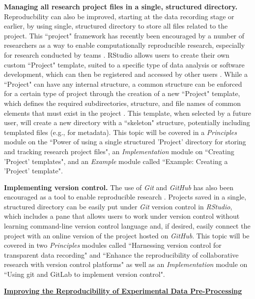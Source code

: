 \documentclass[pdftex,english,11pt,parskip=half]{scrartcl}
\begin{document}
\textbf{Managing all research project files in a single, structured directory.} Reproducbility can also be improved, starting at the data recording stage or earlier, by using single, structured directory to store all files related to the project. This ``project" framework has recently been encouraged by a number of researchers as a way to enable computationally reproducible research, especially for research conducted by teams \cite{marwick2017packaging, parker2017opinionated, lowndes2017our}. RStudio allows users to create their own custom ``Project" template, suited to a specific type of data analysis or software development, which can then be registered and accessed by other users \cite{rstudioprojecttemplate}. While a ``Project" can have any internal structure, a common structure can be enforced for a certain type of project through the creation of a new ``Project" template, which defines the required subdirectories, structure, and file names of common elements that must exist in the project \cite{rstudioprojecttemplate}. This template, when selected by a future user, will create a new directory with a ``skeleton" structure, potentially including templated files (e.g., for metadata). This topic will be covered in a \textit{Principles} module on the ``Power of using a single structured 'Project' directory for storing and tracking research project files", an \textit{Implementation} module on ``Creating 'Project' templates", and an \textit{Example} module called ``Example: Creating a 'Project' template".

\textbf{Implementing version control.} The use of \textit{Git} and \textit{GitHub} has also been encouraged as a tool to enable reproducible research \cite{piccolo2016tools, ram2013git, bryan2017excuse, lowndes2017our, cetinkaya2017infrastructure}. Projects saved in a single, structured directory can be easily put under \textit{Git} version control in \textit{RStudio}, which includes a pane that allows users to work under version control without learning command-line version control language and, if desired, easily connect the project with an online version of the project hosted on \textit{GitHub}.  This topic will be covered in two \textit{Principles} modules called ``Harnessing version control for transparent data recording" and ``Enhance the reproducibility of collaborative research with version control platforms" as well as an \textit{Implementation} module on ``Using git and GitLab to implement version control".

\underline{\textbf{Improving the Reproducibility of Experimental Data Pre-Processing}}
\end{document}
